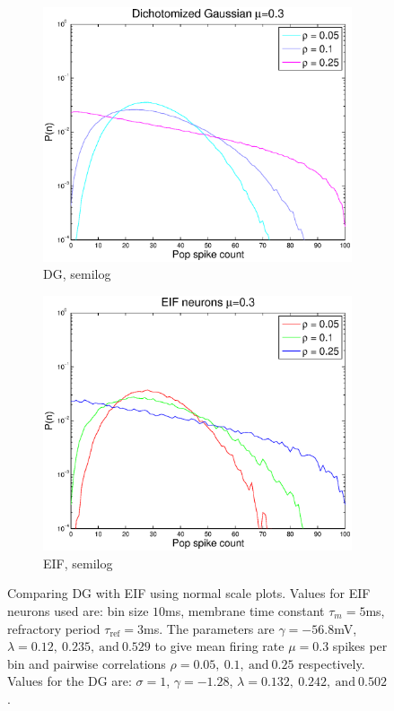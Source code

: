 \documentclass[11pt]{article}
\begin{document}
\begin{figure}[H]
\begin{subfigure}[h]{0.5\textwidth}
	\label{fig10}
	\end{subfigure} \\
	\begin{subfigure}[h]{0.5\textwidth}
	\centering
	\includegraphics[width=\textwidth]{../Figures/DG/DG_Macke_2a_mu_03_semilog}
	\caption{DG, semilog}
	\label{fig11}
	\end{subfigure}
	\begin{subfigure}[h]{0.5\textwidth}
	\centering
	\includegraphics[width=\textwidth]{../Figures/EIF/EIF_Macke_2a_mu_03_semilog}
	\caption{EIF, semilog}
	\label{fig12}
	\end{subfigure}
	\caption{\footnotesize Comparing DG with EIF using normal scale plots. Values for EIF neurons used are: bin size $10$ms, membrane time constant $\tau_m = 5$ms, refractory period $\tau_\text{ref} = 3$ms. The parameters are $\gamma = -56.8$mV, $\lambda = 0.12,~0.235,~\text{and}~0.529$ to give mean firing rate $\mu = 0.3$ spikes per bin and pairwise correlations $\rho = 0.05,~0.1,~\text{and}~0.25$ respectively. Values for the DG are: $\sigma = 1$, $\gamma = -1.28$, $\lambda = 0.132,~0.242,~\text{and}~0.502$.}
\end{figure}
\end{document}
